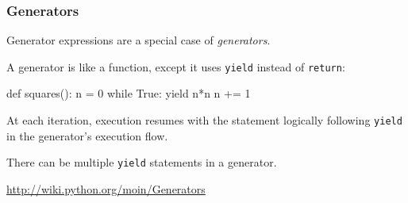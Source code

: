 \documentclass[english,serif,mathserif,xcolor=pdftex,dvipsnames,table]{beamer}
\begin{document}
\begin{frame}[fragile]
  \frametitle{Generators}
  Generator expressions are a special case of \emph{generators}.

  \+ A generator is like a function, except it uses \lstinline|yield|
  instead of \lstinline|return|:
  \begin{python}
    def squares():
      n = 0
      while True:
        yield n*n
        n += 1
  \end{python}

  \+
  At each iteration, execution resumes with the statement logically
  following \lstinline|yield| in the generator's execution flow.

  \+
  There can be multiple \lstinline|yield| statements in a generator.

  \begin{references}
    \url{http://wiki.python.org/moin/Generators}
  \end{references}
\end{frame}
\end{document}
